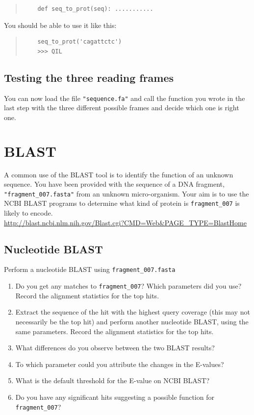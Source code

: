 \documentclass[a4paper,11pt]{article}
\begin{document}
\begin{quote}
\begin{verbatim}
	def seq_to_prot(seq): ...........
\end{verbatim}
\end{quote}

You should be able to use it like this:
\begin{quote}
\begin{verbatim}
	seq_to_prot('cagattctc')
	>>> QIL
\end{verbatim}
\end{quote}

\subsection{Testing the three reading frames}
You can now load the file \texttt{"sequence.fa"} and call the function you wrote in the last step with the three different possible frames and decide which one is right one.


\section{BLAST}
A common use of the BLAST tool is to identify the function of an unknown sequence. You have been provided with the sequence of a DNA fragment, \texttt{"fragment\_007.fasta"} from an unknown micro-organism. Your aim is to use the NCBI BLAST programs to determine what kind of protein is \texttt{fragment\_007} is likely to encode.\\

\url{http://blast.ncbi.nlm.nih.gov/Blast.cgi?CMD=Web&PAGE_TYPE=BlastHome}

\subsection{Nucleotide BLAST}
Perform a nucleotide BLAST using \texttt{fragment\_007.fasta} 
\begin{enumerate}
\item Do you get any matches to \texttt{fragment\_007}? Which parameters did you use? Record the alignment statistics for the top hits.

\item Extract the sequence of the hit with the highest query coverage (this may not necessarily be the top hit) and perform another nucleotide BLAST, using the same parameters. Record the alignment statistics for the top hits.

\item What differences do you observe between the two BLAST results?

\item To which parameter could you attribute the changes in the E-values?  

\item What is the default threshold for the E-value on NCBI BLAST?

\item Do you have any significant hits suggesting a possible function for \texttt{fragment\_007}? 
\end{enumerate}
\end{document}
